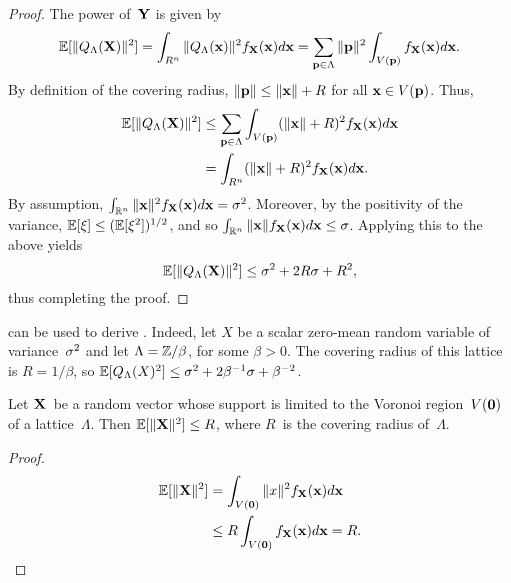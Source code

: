 \begin{subappendices}
  \begin{proof}
    The power of~$\mathbf{Y}$ is given by
    \begin{equation*}
      \mathbb{E}[\|{Q_{\Lambda}}(\mathbf{X})\|^2] = \int_{R^n} \|{Q_{\Lambda}}(\mathbf{x})\|^2 f_{\mathbf{X}}(\mathbf{x}) d\mathbf{x}
      = \sum_{\mathbf{p} \in \Lambda} \|\mathbf{p}\|^2 \int_{V(\mathbf{p})} f_{\mathbf{X}}(\mathbf{x}) d\mathbf{x}.
    \end{equation*}
    By definition of the covering radius, $\|\mathbf{p}\| \le \|\mathbf{x}\| + R$ for all $\mathbf{x}
    \in V(\mathbf{p})$. Thus,
    \begin{align*}
      \mathbb{E}[\|{Q_{\Lambda}}(\mathbf{X})\|^2] &\le \sum_{\mathbf{p} \in \Lambda} \int_{V(\mathbf{p})} (\|\mathbf{x}\| + R)^2
      f_{\mathbf{X}}(\mathbf{x}) d\mathbf{x} \\
      &= \int_{R^n} (\|\mathbf{x}\| + R)^2 f_{\mathbf{X}}(\mathbf{x}) d\mathbf{x}.
    \end{align*}
    By assumption, $\int_{\mathbb{R}^n} \|\mathbf{x}\|^2 f_{\mathbf{X}}(\mathbf{x}) d\mathbf{x} = {\sigma^2}$. Moreover, by the
    positivity of the variance, $\mathbb{E}[\xi] \le (\mathbb{E}[\xi^2])^{1/2}$, and so
    $\int_{\mathbb{R}^n} \|\mathbf{x}\| f_{\mathbf{X}}(\mathbf{x}) d\mathbf{x} \le \sigma$. Applying this to the above
    yields
    \begin{equation*}
      \mathbb{E}[\|{Q_{\Lambda}}(\mathbf{X})\|^2] \le {\sigma^2} + 2R\sigma + R^2,
    \end{equation*}
    thus completing the proof.
  \end{proof}

  \begin{example}
     can be used to derive . Indeed,
    let $X$ be a scalar zero-mean random variable of variance~${\sigma^2}$ and let
    $\Lambda = \mathbb{Z} / \beta$, for some $\beta > 0$. The covering radius of this
    lattice is $R = 1/\beta$, so $\mathbb{E}[{Q_{\Lambda}}(X)^2] \le {\sigma^2} + 2 \beta^{-1} \sigma +
    \beta^{-2}$. 
  \end{example}

  \begin{lemma}
    \label{lem:voronoivarbound}
    Let $\mathbf{X}$~be a random vector whose support is limited to the Voronoi
    region~$V(\mathbf{0})$ of a lattice~$\Lambda$. Then $\mathbb{E}[\|\mathbf{X}\|^2] \le R$, where
    $R$~is the covering radius of~$\Lambda$.
  \end{lemma}

  \begin{proof}
    \begin{align*}
      \mathbb{E}[\|\mathbf{X}\|^2] & = \int_{V(\mathbf{0})} \|x\|^2 f_{\mathbf{X}}(\mathbf{x}) d\mathbf{x} \\
      & \le R \int_{V(\mathbf{0})} f_{\mathbf{X}}(\mathbf{x}) d\mathbf{x} = R.
    \end{align*}
  \end{proof}





\end{subappendices}
